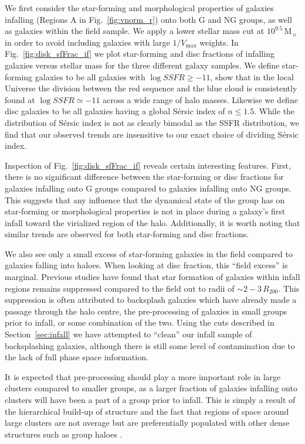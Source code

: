 \documentclass[a4paper,fleqn,usenatbib]{mnras}
\newcommand{\Msun}{\,\mathrm{M_{\sun}}}
\begin{document}
We first consider the star-forming and morphological properties of
galaxies infalling (Regions A in Fig.~\ref{fig:vnorm_r}) onto both G
and NG groups, as well as galaxies within the field sample.  We apply
a lower stellar mass cut at $10^{9.5}\Msun$ in order to avoid
including galaxies with large $1/V_\mathrm{max}$ weights.  In
Fig.~\ref{fig:disk_sfFrac_if} we plot star-forming and disc fractions
of infalling galaxies
versus stellar mass for the three different galaxy samples.  We define
star-forming galaxies to be all galaxies with $\log SSFR \ge -11$,
\citet{wetzel2012} show that in the local Universe the division
between the red sequence and the blue cloud is consistently found at
$\log SSFR \simeq -11$ across a wide range of halo masses.  Likewise
we define disc galaxies to be all galaxies having a global S\'{e}rsic
index of $n \le 1.5$.  While the distribution of S\'{e}rsic index is
not as clearly bimodal as the SSFR distribution, we find that our
observed trends are insensitive to our exact choice of dividing S\'{e}rsic
index.
\par
Inspection of Fig.~\ref{fig:disk_sfFrac_if} reveals certain
interesting features.  First, there is no significant difference
between the star-forming or disc fractions for galaxies infalling onto
G groups compared to galaxies infalling onto NG
groups.  This suggests that any influence that the dynamical state
of the group
has on star-forming or morphological properties is not in place during
a galaxy's first infall toward the virialized region of the halo.
Additionally, it is worth noting that similar trends are observed for
both star-forming and disc fractions.
\par
We also see only a small excess of star-forming galaxies in the field
compared to galaxies falling into haloes.  When looking at disc fraction, this
``field excess'' is marginal.
Previous studies \citep{lewis2002, gray2004, rines2005, verdugo2008}
have found that star formation of galaxies within infall regions
remains suppressed compared to the field out to radii of
$\sim\!2-3\,R_{200}$.  This suppression is often attributed to
backsplash galaxies which have already made a passage through the halo
centre, the pre-processing of galaxies in small groups prior to
infall, or some combination of the two.  Using the cuts described in
Section~\ref{sec:infall} we have attempted to ``clean'' our infall sample
of backsplashing galaxies, although there is still some level of
contamination due to the lack of full phase space information.
\par
It is expected that pre-processing
should play a more important role in large clusters compared to smaller
groups, as a larger fraction of galaxies infalling onto clusters will
have been a part of a group prior to infall.  This is
simply a result of the hierarchical build-up of structure and the
fact that regions of space around large clusters are not average but
are preferentially populated with other dense structures such as group
haloes \citep[e.g.][]{mo1996, wang2008}.
\end{document}
